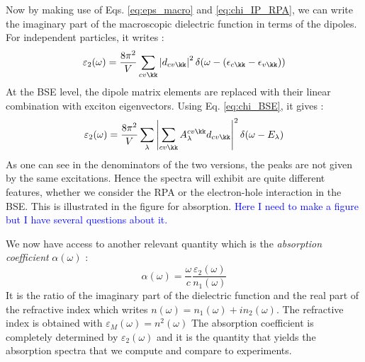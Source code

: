 Now by making use of Eqs. \eqref{eq:eps_macro} and \eqref{eq:chi_IP_RPA}, we can write the imaginary part of the macroscopic dielectric function in terms of the dipoles. For independent particles, it writes :
\begin{equation}
	\varepsilon_2(\omega) = \frac{8\pi^2}{V} \sum_{cv\kk} \left| d_{cv\kk} \right|^2 \delta(\omega - (\epsilon_{c\kk} - \epsilon_{v\kk}) ) \label{eq:eps_2_IP}
\end{equation}
At the \acrshort{BSE} level, the dipole matrix elements are replaced with their linear combination with exciton eigenvectors. Using Eq. \eqref{eq:chi_BSE}, it gives :
\begin{equation}
	\varepsilon_2(\omega) = \frac{8\pi^2}{V} \sum_\lambda \left| \sum_{cv\kk} A_\lambda^{cv\kk} d_{cv\kk} \right|^2 \delta(\omega - E_\lambda) \label{eq:eps_2_exc}
\end{equation}
As one can see in the denominators of the two versions, the peaks are not given by the same excitations. Hence the spectra will exhibit are quite different features, whether we consider the RPA or the electron-hole interaction in the BSE. This is illustrated in the figure for absorption. \textcolor{blue}{Here I need to make a figure but I have several questions about it.}

We now have access to another relevant quantity which is the \textit{absorption coefficient} $\alpha(\omega)$ :
\begin{equation}
	\alpha(\omega) = \frac{\omega}{c} \frac{\varepsilon_2(\omega)}{n_1(\omega)} \label{eq:abs_coeff}
\end{equation}
It is the ratio of the imaginary part of the dielectric function and the real part of the refractive index which writes $n(\omega) = n_1(\omega) + i n_2(\omega)$. The refractive index is obtained with $\varepsilon_M(\omega) = n^2(\omega)$
The absorption coefficient is completely determined by $\varepsilon_2(\omega)$ and it is the quantity that yields the absorption spectra that we compute and compare to experiments.

